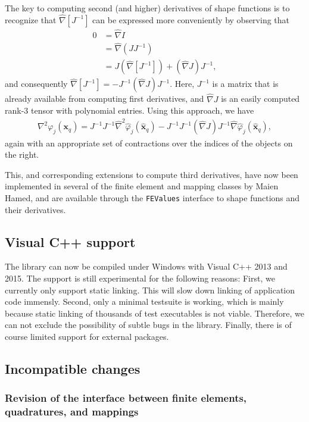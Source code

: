 \documentclass{ansarticle-preprint}
\begin{document}
The key to computing second (and higher) derivatives of shape
functions is to recognize that $\hat\nabla [J^{-1}]$ can be expressed
more conveniently by observing that
\begin{align*}
  0 &= \hat\nabla I
  \\
  &= \hat\nabla (JJ^{-1})
  \\
  &= J (\hat\nabla [J^{-1}]) + (\hat\nabla J) J^{-1},
\end{align*}
and consequently $\hat\nabla [J^{-1}] = - J^{-1} (\hat\nabla J)
J^{-1}$. Here, $J^{-1}$ is a matrix that is already available from
computing first derivatives, and $\hat\nabla J$ is an easily computed
rank-3 tensor with polynomial entries. Using this approach, we have
\begin{align*}
  \nabla^2\varphi_j(\mathbf x_q)
  =
  J^{-1} J^{-1}\hat\nabla^2\hat\varphi_j(\hat{\mathbf x}_q)
  -
  J^{-1} J^{-1} (\hat\nabla J)
  J^{-1}\hat\nabla\hat\varphi_j(\hat{\mathbf x}_q),
\end{align*}
again with an appropriate set of contractions over the indices of the
objects on the right.

This, and corresponding extensions to compute third derivatives, have
now been implemented in several of the finite element and mapping
classes by Maien Hamed, and are available through the
\texttt{FEValues} interface to shape functions and their derivatives.

\subsection{Visual C++ support}

The library can now be compiled under Windows with Visual C++ 2013 and
2015. The support is still experimental for the following reasons: First, we
currently only support static linking. This will slow down linking of
application code immensly.  Second, only a minimal testsuite is working, which
is mainly because static linking of thousands of test executables is not
viable. Therefore, we can not exclude the possibility of subtle bugs in the
library.  Finally, there is of course limited support for external packages.

\subsection{Incompatible changes}

\subsubsection{Revision of the interface between finite elements,
  quadratures, and mappings}
\end{document}
